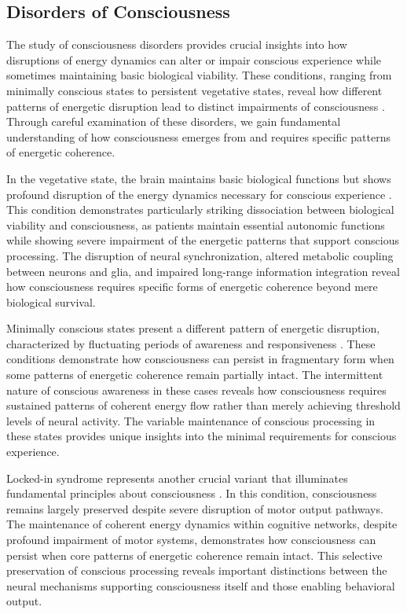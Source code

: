 \begin{refsection}
\section{Disorders of Consciousness}

The study of consciousness disorders provides crucial insights into how disruptions of energy dynamics can alter or impair conscious experience while sometimes maintaining basic biological viability. These conditions, ranging from minimally conscious states to persistent vegetative states, reveal how different patterns of energetic disruption lead to distinct impairments of consciousness \cite{Giacino2014}. Through careful examination of these disorders, we gain fundamental understanding of how consciousness emerges from and requires specific patterns of energetic coherence.

In the vegetative state, the brain maintains basic biological functions but shows profound disruption of the energy dynamics necessary for conscious experience \cite{Laureys2004}. This condition demonstrates particularly striking dissociation between biological viability and consciousness, as patients maintain essential autonomic functions while showing severe impairment of the energetic patterns that support conscious processing. The disruption of neural synchronization, altered metabolic coupling between neurons and glia, and impaired long-range information integration reveal how consciousness requires specific forms of energetic coherence beyond mere biological survival.

Minimally conscious states present a different pattern of energetic disruption, characterized by fluctuating periods of awareness and responsiveness \cite{DiPerri2014}. These conditions demonstrate how consciousness can persist in fragmentary form when some patterns of energetic coherence remain partially intact. The intermittent nature of conscious awareness in these cases reveals how consciousness requires sustained patterns of coherent energy flow rather than merely achieving threshold levels of neural activity. The variable maintenance of conscious processing in these states provides unique insights into the minimal requirements for conscious experience.

Locked-in syndrome represents another crucial variant that illuminates fundamental principles about consciousness \cite{Casali2013}. In this condition, consciousness remains largely preserved despite severe disruption of motor output pathways. The maintenance of coherent energy dynamics within cognitive networks, despite profound impairment of motor systems, demonstrates how consciousness can persist when core patterns of energetic coherence remain intact. This selective preservation of conscious processing reveals important distinctions between the neural mechanisms supporting consciousness itself and those enabling behavioral output.


\end{refsection}
